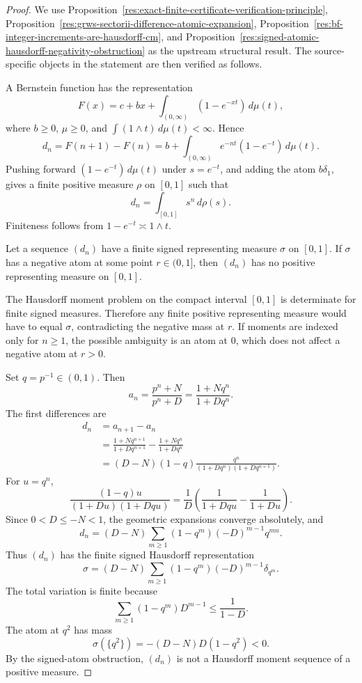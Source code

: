 \documentclass[11pt]{article}
\numberwithin{equation}{section}
\theoremstyle{definition}
\theoremstyle{remark}
\newcommand{\1}{\mathbf 1}
\begin{document}
\begin{proof}
We use Proposition~\ref{res:exact-finite-certificate-verification-principle}, Proposition~\ref{res:grws-sectorii-difference-atomic-expansion}, Proposition~\ref{res:bf-integer-increments-are-hausdorff-cm}, and Proposition~\ref{res:signed-atomic-hausdorff-negativity-obstruction} as the upstream structural result. The source-specific objects in the statement are then verified as follows.

A Bernstein function has the representation
\[
F(x)=c+bx+\int_{(0,\infty)}(1-e^{-xt})\,d\mu(t),
\]
where \(b\ge0\), \(\mu\ge0\), and \(\int(1\wedge t)\,d\mu(t)<\infty\). Hence
\[
d_n=F(n+1)-F(n)
=b+\int_{(0,\infty)}e^{-nt}(1-e^{-t})\,d\mu(t).
\]
Pushing forward \((1-e^{-t})\,d\mu(t)\) under \(s=e^{-t}\), and adding the atom \(b\delta_1\), gives a finite positive measure \(\rho\) on \([0,1]\) such that
\[
d_n=\int_{[0,1]}s^n\,d\rho(s).
\]
Finiteness follows from \(1-e^{-t}\asymp 1\wedge t\).

Let a sequence \((d_n)\) have a finite signed representing measure \(\sigma\) on \([0,1]\). If \(\sigma\) has a negative atom at some point \(r\in(0,1]\), then \((d_n)\) has no positive representing measure on \([0,1]\).

The Hausdorff moment problem on the compact interval \([0,1]\) is determinate for finite signed measures. Therefore any finite positive representing measure would have to equal \(\sigma\), contradicting the negative mass at \(r\). If moments are indexed only for \(n\ge1\), the possible ambiguity is an atom at \(0\), which does not affect a negative atom at \(r>0\).

Set \(q=p^{-1}\in(0,1)\). Then
\[
a_n=\frac{p^n+N}{p^n+D}
=\frac{1+Nq^n}{1+Dq^n}.
\]
The first differences are
\[
\begin{aligned}
d_n
&=a_{n+1}-a_n\\
&=\frac{1+Nq^{n+1}}{1+Dq^{n+1}}
  -\frac{1+Nq^n}{1+Dq^n}\\
&=(D-N)(1-q)\frac{q^n}{(1+Dq^n)(1+Dq^{n+1})}.
\end{aligned}
\]
For \(u=q^n\),
\[
\frac{(1-q)u}{(1+Du)(1+Dqu)}
=\frac1D\left(\frac1{1+Dqu}-\frac1{1+Du}\right).
\]
Since \(0<D\le -N<1\), the geometric expansions converge absolutely, and
\[
d_n
=(D-N)\sum_{m\ge1}(1-q^m)(-D)^{m-1}q^{mn}.
\]
Thus \((d_n)\) has the finite signed Hausdorff representation
\[
\sigma
=(D-N)\sum_{m\ge1}(1-q^m)(-D)^{m-1}\delta_{q^m}.
\]
The total variation is finite because
\[
\sum_{m\ge1}(1-q^m)D^{m-1}\le \frac1{1-D}.
\]
The atom at \(q^2\) has mass
\[
\sigma(\{q^2\})=-(D-N)D(1-q^2)<0.
\]
By the signed-atom obstruction, \((d_n)\) is not a Hausdorff moment sequence of a positive measure.


\end{proof}
\end{document}
